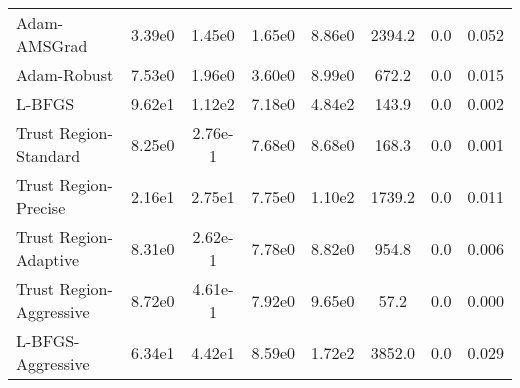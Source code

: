 \documentclass{article}
\begin{document}
\begin{table}[htbp]
{\begin{tabular}{p{2.5cm}*{7}{c}}
Adam-AMSGrad & 3.39e0 & 1.45e0 & 1.65e0 & 8.86e0 & 2394.2 & 0.0 & 0.052 \\
Adam-Robust & 7.53e0 & 1.96e0 & 3.60e0 & 8.99e0 & 672.2 & 0.0 & 0.015 \\
L-BFGS & 9.62e1 & 1.12e2 & 7.18e0 & 4.84e2 & 143.9 & 0.0 & 0.002 \\
Trust Region-Standard & 8.25e0 & 2.76e-1 & 7.68e0 & 8.68e0 & 168.3 & 0.0 & 0.001 \\
Trust Region-Precise & 2.16e1 & 2.75e1 & 7.75e0 & 1.10e2 & 1739.2 & 0.0 & 0.011 \\
Trust Region-Adaptive & 8.31e0 & 2.62e-1 & 7.78e0 & 8.82e0 & 954.8 & 0.0 & 0.006 \\
Trust Region-Aggressive & 8.72e0 & 4.61e-1 & 7.92e0 & 9.65e0 & 57.2 & 0.0 & 0.000 \\
L-BFGS-Aggressive & 6.34e1 & 4.42e1 & 8.59e0 & 1.72e2 & 3852.0 & 0.0 & 0.029 \\
\bottomrule
\end{tabular}
}
\end{table}
\end{document}
